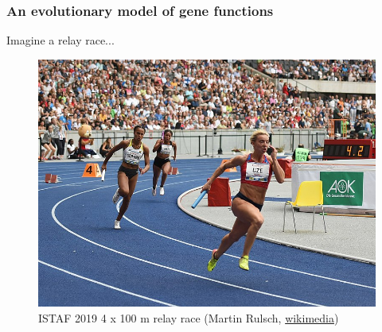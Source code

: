 \documentclass[aspectratio=169, 9pt, handout]{beamer}
\begin{document}
\begin{frame}[t]
\begin{minipage}[m]{.65\linewidth}
		
	\end{minipage}
\end{frame}

\begin{frame}
	\frametitle{An evolutionary model of gene functions}
	
	Imagine a relay race...
	\begin{figure}
		\includegraphics[width=.55\linewidth]{800px-2019-09-01_ISTAF_2019_4_x_100_m_relay_race_(Martin_Rulsch)_10.jpg}
		\caption{ISTAF 2019 4 x 100 m relay race (Martin Rulsch, \href{https://commons.wikimedia.org/wiki/File:2019-09-01_ISTAF_2019_4_x_100_m_relay_race_(Martin_Rulsch)_10.jpg}{wikimedia})}
	\end{figure}
	
\end{frame}
\end{document}
